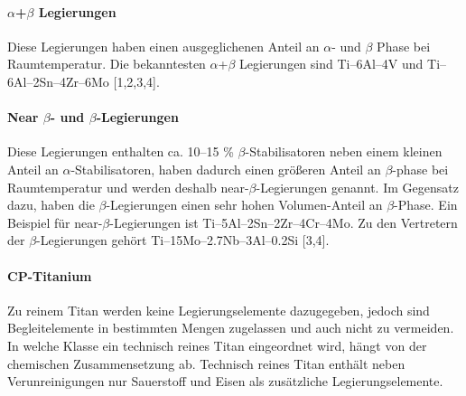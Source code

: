 \paragraph{$\alpha$+$\beta$ Legierungen}
Diese Legierungen haben einen ausgeglichenen Anteil an $\alpha$- und $\beta$ Phase bei Raumtemperatur. Die bekanntesten $\alpha$+$\beta$ Legierungen sind Ti–6Al–4V und Ti–6Al–2Sn–4Zr–6Mo [1,2,3,4].

\paragraph{Near $\beta$- und $\beta$-Legierungen}
Diese Legierungen enthalten ca. 10--15 \% $\beta$-Stabilisatoren neben einem kleinen Anteil an $\alpha$-Stabilisatoren, haben dadurch einen größeren Anteil an $\beta$-phase bei Raumtemperatur und werden deshalb near-$\beta$-Legierungen genannt. Im Gegensatz dazu, haben die $\beta$-Legierungen einen sehr hohen Volumen-Anteil an $\beta$-Phase. Ein Beispiel für near-$\beta$-Legierungen ist Ti–5Al–2Sn–2Zr–4Cr–4Mo. Zu den Vertretern der $\beta$-Legierungen gehört Ti–15Mo–2.7Nb–3Al–0.2Si [3,4].

\paragraph{CP-Titanium} 
Zu reinem Titan werden keine Legierungselemente dazugegeben, jedoch sind Begleitelemente in bestimmten Mengen zugelassen und auch nicht zu vermeiden. In welche Klasse ein technisch reines Titan eingeordnet wird, hängt von der chemischen Zusammensetzung ab. Technisch reines Titan enthält neben Verunreinigungen nur Sauerstoff und Eisen als zusätzliche Legierungselemente.



